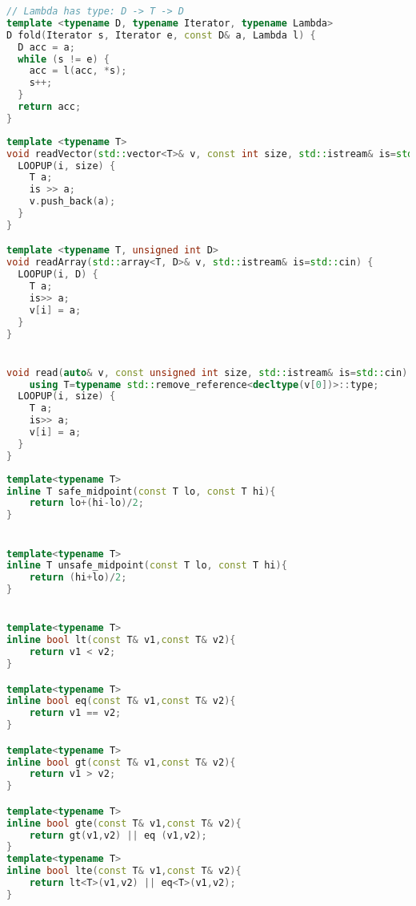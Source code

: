 \begin{lstlisting}[language=c++, caption="Store credit c++ solution"]
// Lambda has type: D -> T -> D
template <typename D, typename Iterator, typename Lambda>
D fold(Iterator s, Iterator e, const D& a, Lambda l) {
  D acc = a;
  while (s != e) {
    acc = l(acc, *s);
    s++;
  }
  return acc;
}

\end{lstlisting}


\begin{lstlisting}[language=c++, caption="Read input functions"]
template <typename T>
void readVector(std::vector<T>& v, const int size, std::istream& is=std::cin) {
  LOOPUP(i, size) {
    T a;
    is >> a;
    v.push_back(a);
  }
}

template <typename T, unsigned int D>
void readArray(std::array<T, D>& v, std::istream& is=std::cin) {
  LOOPUP(i, D) {
    T a;
    is>> a;
    v[i] = a;
  }
}


void read(auto& v, const unsigned int size, std::istream& is=std::cin) {
    using T=typename std::remove_reference<decltype(v[0])>::type;
  LOOPUP(i, size) {
    T a;
    is>> a;
    v[i] = a;
  }
}
\end{lstlisting}


\begin{lstlisting}[language=c++, caption="Store credit c++ solution"]
template<typename T>
inline T safe_midpoint(const T lo, const T hi){
    return lo+(hi-lo)/2;
}


template<typename T>
inline T unsafe_midpoint(const T lo, const T hi){
    return (hi+lo)/2;
}


template<typename T>
inline bool lt(const T& v1,const T& v2){
    return v1 < v2;
}

template<typename T>
inline bool eq(const T& v1,const T& v2){
    return v1 == v2;
}

template<typename T>
inline bool gt(const T& v1,const T& v2){
    return v1 > v2;
}

template<typename T>
inline bool gte(const T& v1,const T& v2){
    return gt(v1,v2) || eq (v1,v2);
}
template<typename T>
inline bool lte(const T& v1,const T& v2){
    return lt<T>(v1,v2) || eq<T>(v1,v2);
}

\end{lstlisting}




